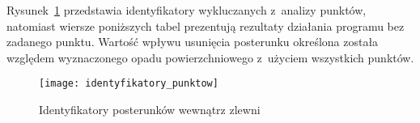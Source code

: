 Rysunek~\ref{fig:numery_posterunkow} przedstawia identyfikatory wykluczanych z~analizy punktów, natomiast wiersze poniższych tabel prezentują rezultaty działania programu bez zadanego punktu. Wartość wpływu usunięcia posterunku określona została względem wyznaczonego opadu powierzchniowego z~użyciem wszystkich punktów.

\begin{figure}[!ht]
	\centering
	\texttt{[image: identyfikatory\_punktow]}
	\caption{Identyfikatory posterunków wewnątrz zlewni}
	\label{fig:numery_posterunkow}
\end{figure}



